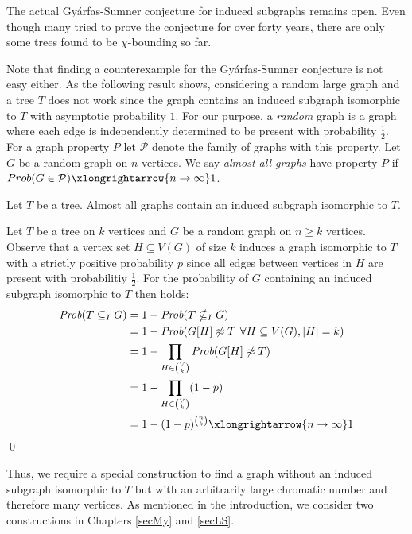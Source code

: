 The actual Gyárfas-Sumner conjecture for induced subgraphs remains open. Even though many tried to prove the conjecture for over forty years, there are only some trees found to be $\chi$-bounding so far. 

Note that finding a counterexample for the Gyárfas-Sumner conjecture is not easy either. As the following result shows, considering a random large graph and a tree $T$ does not work since the graph contains an induced subgraph isomorphic to $T$ with asymptotic probability $1$. For our purpose, a \textit{random} graph is a graph where each edge is independently determined to be present with probability $\frac{1}{2}$. For a graph property $P$ let $\mathcal{P}$ denote the family of graphs with this property. Let $G$ be a random graph on $n$ vertices. We say \textit{almost all graphs} have property $P$ if $Prob(G\in\mathcal{P})\xlongrightarrow{{n\to\infty}} 1$.
\begin{thm}
Let $T$ be a tree. Almost all graphs contain an induced subgraph isomorphic to $T$.
\end{thm}
\begin{prf}
Let $T$ be a tree on $k$ vertices and $G$ be a random graph on $n\geq k$ vertices. Observe that a vertex set $H\subseteq V(G)$ of size $k$ induces a graph isomorphic to $T$ with a strictly positive probability $p$ since all edges between vertices in $H$ are present with probabilitiy $\frac{1}{2}$. For the probability of $G$ containing an induced subgraph isomorphic to $T$ then holds:
\begin{equation*}
\begin{split}
\textit{Prob}(T\subseteq_I G) &= 1-\textit{Prob}(T\nsubseteq_I G)\\
&=1-\textit{Prob}(G[H]\not\approx T \hspace{0.4em}\forall H\subseteq V(G), \vert H\vert =k)\\
&=1-\prod_{H\in {V\choose k}}\textit{Prob}(G[H]\not\approx T)\\
&=1-\prod_{H\in {V\choose k}} (1-p)\\
&=1-(1-p)^{n\choose k}\xlongrightarrow{{n\to\infty}} 1
\end{split}
\end{equation*}
\qed
\end{prf}
Thus, we require a special construction to find a graph without an induced subgraph isomorphic to $T$ but with an arbitrarily large chromatic number and therefore many vertices. As mentioned in the introduction, we consider two constructions in Chapters \ref{secMy} and \ref{secLS}.

